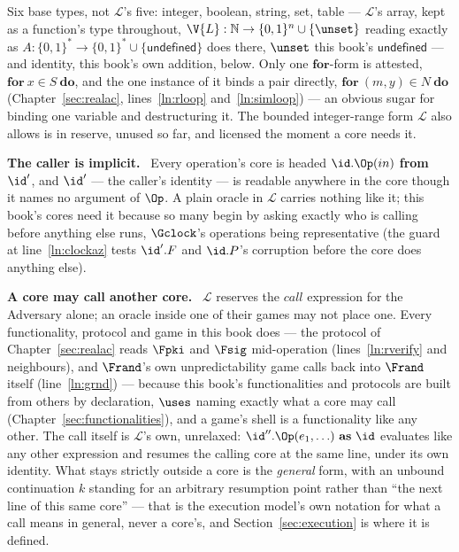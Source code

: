 \documentclass[10pt,oneside,openany]{book}
\newcommand{\heading}[1]{\medskip\par\noindent\textcolor{accent}{\textbf{#1.}}\ }
\theoremstyle{accentdef}
\theoremstyle{accentplain}
\begin{document}
Six base types, not $\mathcal{L}$'s five: integer, boolean, string, set, table --- $\mathcal{L}$'s
array, kept as a function's type throughout, $\V{L} : \mathbb{N} \to \{0,1\}^{n} \cup \{\unset\}$
reading exactly as $A : \{0,1\}^{*} \to \{0,1\}^{*} \cup \{\textsf{undefined}\}$ does there,
$\unset$ this book's $\textsf{undefined}$ --- and identity, this book's own addition, below. Only
one $\textbf{for}$-form is attested, $\textbf{for}\ x \in S\ \textbf{do}$, and the one instance of
it binds a pair directly, $\textbf{for}\ (m,y) \in N\ \textbf{do}$ (Chapter~\ref{sec:realac},
lines~\ref{ln:rloop} and~\ref{ln:simloop}) --- an obvious sugar for binding one variable and
destructuring it. The bounded integer-range form $\mathcal{L}$ also allows is in reserve, unused
so far, and licensed the moment a core needs it.

\heading{The caller is implicit} Every operation's core is headed $\id.\Op(in)$
\textbf{from}~$\id'$, and $\id'$ --- the caller's identity --- is readable anywhere in the core
though it names no argument of $\Op$. A plain oracle in $\mathcal{L}$ carries nothing like it; this
book's cores need it because so many begin by asking exactly who is calling before anything else
runs, $\Gclock$'s operations being representative (the guard at line~\ref{ln:clockaz} tests
$\id'.F$ and $\id.P$'s corruption before the core does anything else).

\heading{A core may call another core} $\mathcal{L}$ reserves the $\mathit{call}$ expression for
the Adversary alone; an oracle inside one of their games may not place one. Every functionality,
protocol and game in this book does --- the protocol of Chapter~\ref{sec:realac} reads $\Fpki$
and $\Fsig$ mid-operation (lines~\ref{ln:rverify} and neighbours), and $\Frand$'s own
unpredictability game calls back into $\Frand$ itself (line~\ref{ln:grnd}) --- because this book's
functionalities and protocols are built from others by declaration, $\uses$ naming exactly what a
core may call (Chapter~\ref{sec:functionalities}), and a game's shell is a functionality like any
other. The call itself is $\mathcal{L}$'s own, unrelaxed: $\id''.\Op(e_1,\ldots)\ \textbf{as}\ \id$
evaluates like any other expression and resumes the calling core at the same line, under its own
identity. What stays strictly outside a core is the \emph{general} form, with an unbound
continuation $k$ standing for an arbitrary resumption point rather than ``the next line of this
same core'' --- that is the execution model's own notation for what a call means in general,
never a core's, and Section~\ref{sec:execution} is where it is defined.
\end{document}
